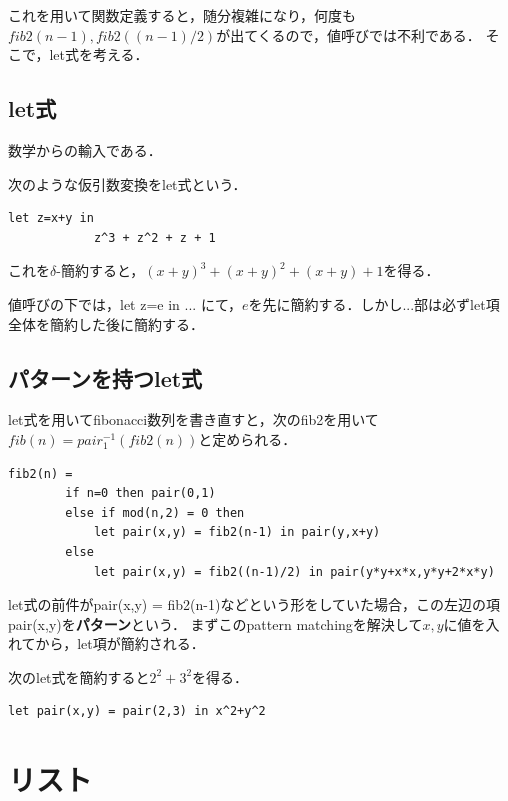 \documentclass[uplatex, dvipdfmx]{jsreport}
\begin{document}
これを用いて関数定義すると，随分複雑になり，何度も$fib2(n-1),fib2((n-1)/2)$が出てくるので，値呼びでは不利である．
そこで，let式を考える．

\subsection{let式}

数学からの輸入である．
\begin{definition}[let式]
    次のような仮引数変換をlet式という．
    \begin{lstlisting}[caption=let formula]
        let z=x+y in
            z^3 + z^2 + z + 1
    \end{lstlisting}
    これを$\delta$-簡約すると，$(x+y)^3+(x+y)^2+(x+y)+1$を得る．
\end{definition}
\begin{remark}
    値呼びの下では，let z=e in ... にて，$e$を先に簡約する．しかし...部は必ずlet項全体を簡約した後に簡約する．
\end{remark}

\subsection{パターンを持つlet式}

let式を用いてfibonacci数列を書き直すと，次のfib2を用いて$fib(n)=pair_1^{-1}(fib2(n))$と定められる．
\begin{lstlisting}[caption=fibonacci constructor]
    fib2(n) = 
        if n=0 then pair(0,1)
        else if mod(n,2) = 0 then
            let pair(x,y) = fib2(n-1) in pair(y,x+y)
        else
            let pair(x,y) = fib2((n-1)/2) in pair(y*y+x*x,y*y+2*x*y)
\end{lstlisting}

\begin{definition}[pattern]
    let式の前件がpair(x,y) = fib2(n-1)などという形をしていた場合，この左辺の項pair(x,y)を\textbf{パターン}という．
    まずこのpattern matchingを解決して$x,y$に値を入れてから，let項が簡約される．
\end{definition}
\begin{example}
    次のlet式を簡約すると$2^2+3^2$を得る．
    \begin{lstlisting}[caption=pattern matching]
        let pair(x,y) = pair(2,3) in x^2+y^2
    \end{lstlisting}
\end{example}

\section{リスト}
\end{document}
